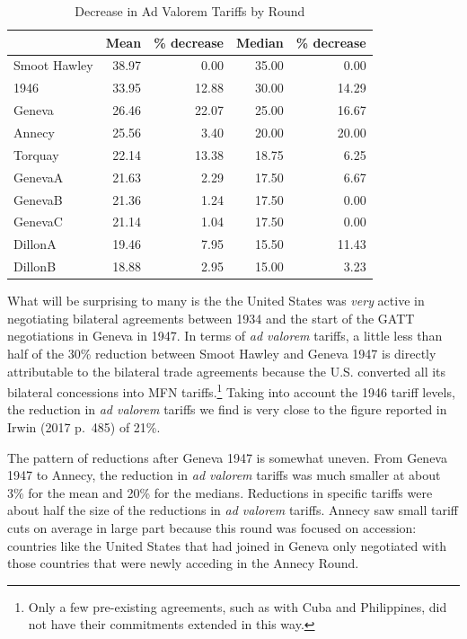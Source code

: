 \documentclass[
  12pt,
]{article}
\begin{document}
\begin{table}[!h]

\caption{\label{tab:av-rd}Decrease in Ad Valorem Tariffs by Round}
\centering
\begin{tabular}[t]{lrrrr}
\toprule
  & Mean & \% decrease & Median & \% decrease\\
\midrule
Smoot Hawley & 38.97 & 0.00 & 35.00 & 0.00\\
1946 & 33.95 & 12.88 & 30.00 & 14.29\\
Geneva & 26.46 & 22.07 & 25.00 & 16.67\\
Annecy & 25.56 & 3.40 & 20.00 & 20.00\\
Torquay & 22.14 & 13.38 & 18.75 & 6.25\\
\addlinespace
GenevaA & 21.63 & 2.29 & 17.50 & 6.67\\
GenevaB & 21.36 & 1.24 & 17.50 & 0.00\\
GenevaC & 21.14 & 1.04 & 17.50 & 0.00\\
DillonA & 19.46 & 7.95 & 15.50 & 11.43\\
DillonB & 18.88 & 2.95 & 15.00 & 3.23\\
\bottomrule
\end{tabular}
\end{table}

What will be surprising to many is the the United States was \emph{very} active in negotiating bilateral agreements between 1934 and the start of the GATT negotiations in Geneva in 1947. In terms of \emph{ad valorem} tariffs, a little less than half of the 30\% reduction between Smoot Hawley and Geneva 1947 is directly attributable to the bilateral trade agreements because the U.S. converted all its bilateral concessions into MFN tariffs.\footnote{Only a few pre-existing agreements, such as with Cuba and Philippines, did not have their commitments extended in this way.} Taking into account the 1946 tariff levels, the reduction in \emph{ad valorem} tariffs we find is very close to the figure reported in Irwin (2017 p.~485) of 21\%.

The pattern of reductions after Geneva 1947 is somewhat uneven. From Geneva 1947 to Annecy, the reduction in \emph{ad valorem} tariffs was much smaller at about 3\% for the mean and 20\% for the medians. Reductions in specific tariffs were about half the size of the reductions in \emph{ad valorem} tariffs. Annecy saw small tariff cuts on average in large part because this round was focused on accession: countries like the United States that had joined in Geneva only negotiated with those countries that were newly acceding in the Annecy Round.
\end{document}
